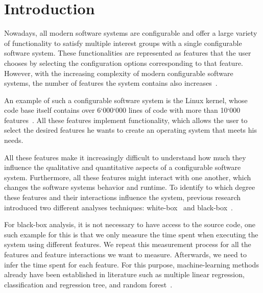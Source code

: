 \chapter{Introduction}\label{ch:introduction}

Nowadays, all modern software systems are configurable and offer a large variety of functionality to satisfy multiple 
interest groups with a single configurable software system. These functionalities are represented as features that the user chooses by selecting the 
configuration options corresponding to that feature. However, with the increasing complexity of modern configurable software systems, 
the number of features the system contains also increases~\cite{Feature-Oriented-Software-Product-Lines}.


An example of such a configurable software system is the Linux kernel, whose
code base itself contains over 6‘000‘000 lines of code with more than 10‘000 features~\cite{Linux-Kernel}.
All these features implement functionality, which allows the user to select the desired features he
wants to create an operating system that meets his needs.

All these features make it increasingly difficult to understand how much they influence the qualitative and quantitative
aspects of a configurable software system. 
Furthermore, all these features might interact with one another, which changes the software systems behavior and runtime. 
To identify to which degree these features and their interactions influence the system, previous research introduced two different analyses techniques: 
white-box~\cite{Comprex, ConfigCrusher} and black-box~\cite{Linear-Regression-Performance, Performance-influence-models-for-highly-configurable-systems}.

For black-box analysis, 
it is not necessary to have access to the source code, one such example for this is that we only measure the time spent when executing the system using different features. 
We repeat this measurement process for all the features and feature interactions we want to measure. 
Afterwards, we need to infer the time spent for each feature. 
For this purpose, machine-learning methods already have been established in literature such as multiple linear regression, 
classification and regression tree, and random forest~\cite{Interplay-of-sampling, Performance-influence-models-for-highly-configurable-systems, Linear-Regression-Performance}.

